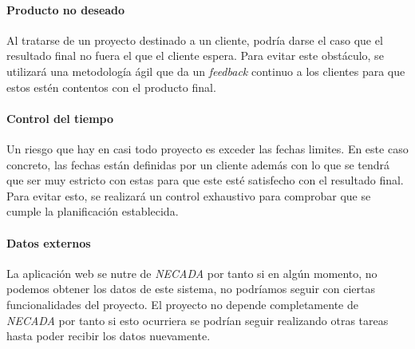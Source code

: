 \paragraph{Producto no deseado}
Al tratarse de un proyecto destinado a un cliente, podría darse el caso que el resultado final no fuera el que el cliente espera. Para evitar este obstáculo, se utilizará una metodología ágil que da un \textit{feedback} continuo a los clientes para que estos estén contentos con el producto final.
\paragraph{Control del tiempo}
Un riesgo que hay en casi todo proyecto es exceder las fechas limites. En este caso concreto, las fechas están definidas por un cliente además con lo que se tendrá que ser muy estricto con estas para que este esté satisfecho con el resultado final. Para evitar esto, se realizará un control exhaustivo para comprobar que se cumple la planificación establecida.
\paragraph{Datos externos}
La aplicación web se nutre de \textit{NECADA} por tanto si en algún momento, no podemos obtener los datos de este sistema, no podríamos seguir con ciertas funcionalidades del proyecto. El proyecto no depende completamente de \textit{NECADA} por tanto si esto ocurriera se podrían seguir realizando otras tareas hasta poder recibir los datos nuevamente.

